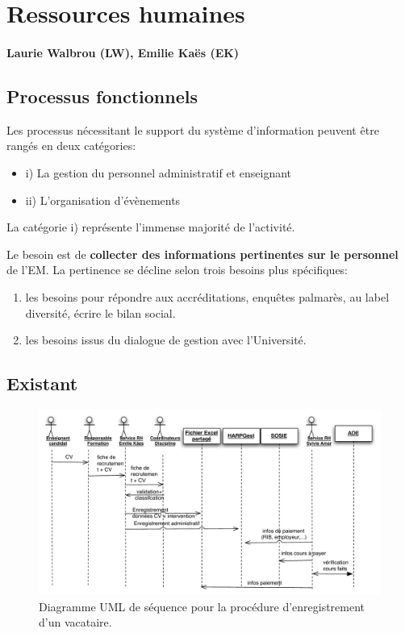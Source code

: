 \documentclass{book}
\begin{document}

\section{Ressources humaines}

\paragraph{Laurie Walbrou (LW), Emilie Kaës (EK)}


\subsection{Processus fonctionnels}
Les processus nécessitant le support du système d'information peuvent 
être rangés en deux catégories:
\begin{itemize}
\item i) La gestion du personnel administratif et enseignant
\item ii) L'organisation d'évènements
\end{itemize}
\bigskip

La catégorie i) représente l'immense majorité de l'activité.

Le besoin est de \textbf{collecter des informations pertinentes
sur le personnel} de l'EM. La pertinence se décline selon
trois besoins plus spécifiques:
\begin{enumerate}
\item les besoins pour répondre aux accréditations, enquêtes palmarès, 
	au label diversité, écrire le bilan social.

\item les besoins issus du dialogue de gestion avec l'Université.
\end{enumerate}


\subsection{Existant}

\begin{figure}[hbt]
\begin{center}
\includegraphics[width=\linewidth]{figs/rh_seq_vacataires.pdf}
\end{center}
\caption{Diagramme UML de séquence pour la procédure d'enregistrement d'un vacataire.}
\label{fg:rh_seq_vacataires}
\end{figure}
\end{document}
